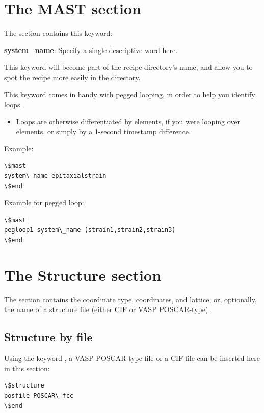 \documentclass[letterpaper,10pt,english]{sphinxmanual}
\begin{document}
\section{The MAST section}
\label{3_1_0_mast::doc}\label{3_1_0_mast:the-mast-section}
The  section contains this keyword:

\textbf{system\_name}: Specify a single descriptive word here.

This keyword will become part of the recipe directory's name, and allow you to spot the recipe more easily in the  directory.

This keyword comes in handy with pegged looping, in order to help you identify loops.
\begin{itemize}
\item {} 
Loops are otherwise differentiated by elements, if you were looping over elements, or simply by a 1-second timestamp difference.

\end{itemize}

Example:

\begin{Verbatim}[commandchars=\\\{\}]
\$mast
system\_name epitaxialstrain
\$end
\end{Verbatim}

Example for pegged loop:

\begin{Verbatim}[commandchars=\\\{\}]
\$mast
pegloop1 system\_name (strain1,strain2,strain3)
\$end
\end{Verbatim}


\section{The Structure section}
\label{3_1_1_structure:the-structure-section}\label{3_1_1_structure::doc}
The  section contains the coordinate type, coordinates, and lattice, or, optionally, the name of a structure file (either CIF or VASP POSCAR-type).


\subsection{Structure by file}
\label{3_1_1_structure:structure-by-file}
Using the keyword , a VASP POSCAR-type file or a CIF file can be inserted here in this section:

\begin{Verbatim}[commandchars=\\\{\}]
\$structure
posfile POSCAR\_fcc
\$end
\end{Verbatim}
\end{document}
